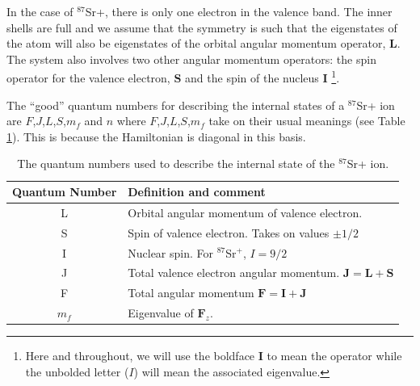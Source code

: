 In the case of $^{87}$Sr+, there is only one electron in the valence band. The inner shells are full and we assume that the symmetry is such that the eigenstates of the atom will also be eigenstates of the orbital angular momentum operator, $\mathbf{L}$.
 The system also involves two other angular momentum operators: the spin operator for the valence electron, $\mathbf{S}$%
 and the spin of the nucleus $\mathbf{I}$ \footnote{Here and throughout, we will use the boldface $\mathbf{I}$ to mean the operator while the unbolded letter ($I$) will mean the associated eigenvalue.}.

The ``good'' quantum numbers for describing the internal states of a $^{87}$Sr+ ion are $F$,$J$,$L$,$S$,$m_f$ and $n$\cite{experimental_hyperfine_alkali_arimondo}\cite{cuaMITnotes} where $F$,$J$,$L$,$S$,$m_f$ take on their usual meanings (see Table\,\ref{quantumNumberQuickref}). This is because the Hamiltonian is diagonal in this basis.

\begin{table}[h!]
\centering
\begin{tabular}{|c|l|}
\hline
Quantum Number & Definition and comment \\ \hline \hline
L & Orbital angular momentum of valence electron. \\ \hline
S & Spin of valence electron. Takes on values $\pm 1/2$ \\ \hline
I & Nuclear spin. For $^{87}$Sr$^+$, $I=9/2$ \\ \hline
J & Total valence electron angular momentum. $\mathbf{J}=\mathbf{L}+\mathbf{S}$ \\ \hline
F & Total angular momentum $\mathbf{F}=\mathbf{I}+\mathbf{J}$ \\ \hline
$m_f$ & Eigenvalue of $\mathbf{F}_z$.\\ \hline
\end{tabular}
\caption{The quantum numbers used to describe the internal state of the $^{87}$Sr+ ion.}
\label{quantumNumberQuickref}
\end{table}


